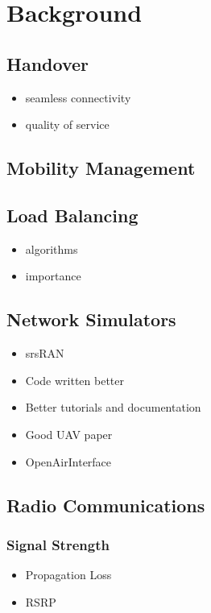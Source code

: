 \chapter{Background}
\section{Handover}
\begin{itemize}
    \item seamless connectivity
    \item quality of service
\end{itemize}
\section{Mobility Management}
\section{Load Balancing}
\begin{itemize}
    \item algorithms
    \item importance
\end{itemize}
\section{Network Simulators}
\begin{itemize}
    \setlength{\itemindent}{0em}
    \item srsRAN
    \setlength{\itemindent}{2em}
    \item Code written better
    \item Better tutorials and documentation
    \item Good UAV paper \cite{powell_handover_2021}
    \setlength{\itemindent}{0em}
    \item OpenAirInterface
\end{itemize}
\section{Radio Communications}
\subsection{Signal Strength}
\begin{itemize}
    \item Propagation Loss
    \item RSRP
\end{itemize}

